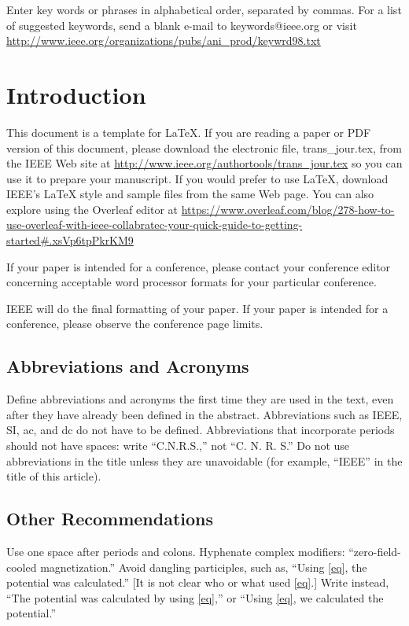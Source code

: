 \documentclass[twoside,web]{ieeecolor}
\begin{document}
\begin{IEEEkeywords}
Enter key words or phrases in alphabetical 
order, separated by commas. For a list of suggested keywords, send a blank 
e-mail to keywords@ieee.org or visit \underline
{http://www.ieee.org/organizations/pubs/ani\_prod/}\discretionary{}{}{}\underline
{keywrd98.txt}
\end{IEEEkeywords}

\section{Introduction}
\label{sec:introduction}
This document is a template for \LaTeX. If you are 
reading a paper or PDF version of this document, please download the 
electronic file, trans\_jour.tex, from the IEEE Web site at \underline
{http://www.ieee.org/authortools/trans\_jour.tex} so you can use it to prepare your manuscript. If 
you would prefer to use LaTeX, download IEEE's LaTeX style and sample files 
from the same Web page. You can also explore using the Overleaf editor at 
\underline
{https://www.overleaf.com/blog/278-how-to-use-overleaf-with-}\discretionary{}{}{}\underline
{ieee-collabratec-your-quick-guide-to-getting-started\#.}\discretionary{}{}{}\underline{xsVp6tpPkrKM9}

If your paper is intended for a conference, please contact your conference 
editor concerning acceptable word processor formats for your particular 
conference. 

IEEE will do the final formatting of your paper. If your paper is intended 
for a conference, please observe the conference page limits. 

\subsection{Abbreviations and Acronyms}
Define abbreviations and acronyms the first time they are used in the text, 
even after they have already been defined in the abstract. Abbreviations 
such as IEEE, SI, ac, and dc do not have to be defined. Abbreviations that 
incorporate periods should not have spaces: write ``C.N.R.S.,'' not ``C. N. 
R. S.'' Do not use abbreviations in the title unless they are unavoidable 
(for example, ``IEEE'' in the title of this article).

\subsection{Other Recommendations}
Use one space after periods and colons. Hyphenate complex modifiers: 
``zero-field-cooled magnetization.'' Avoid dangling participles, such as, 
``Using \eqref{eq}, the potential was calculated.'' [It is not clear who or what 
used \eqref{eq}.] Write instead, ``The potential was calculated by using \eqref{eq},'' or 
``Using \eqref{eq}, we calculated the potential.''
\end{document}
